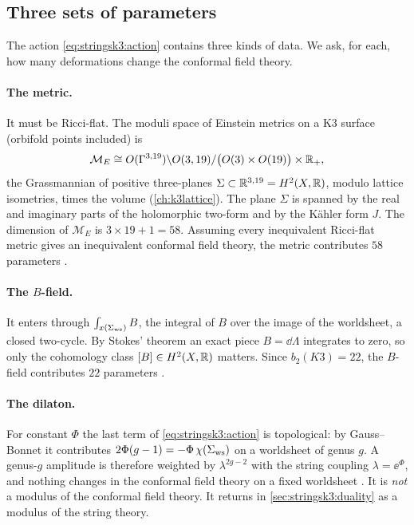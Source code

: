 \subsection{Three sets of parameters}
The action \eqref{eq:stringsk3:action} contains three kinds of data. We ask, for each, how
many deformations change the conformal field theory.

\paragraph{The metric.} It must be Ricci-flat. The moduli space of Einstein metrics on a K3
surface (orbifold points included) is
\begin{equation}\label{eq:stringsk3:einstein}
  \mathcal M_E\cong O(\Gamma^{3,19})\backslash O(3,19)/\big(O(3)\times O(19)\big)\times\mathbb{R}_+ ,
\end{equation}
the Grassmannian of positive three-planes $\Sigma\subset\mathbb{R}^{3,19}=H^2(X,\mathbb{R})$, modulo lattice
isometries, times the volume 
(\cref{ch:k3lattice}). The plane $\Sigma$ is spanned by the real and imaginary parts of the
holomorphic two-form and by the K\"ahler form $J$. The dimension of $\mathcal M_E$ is
$3\times19+1=58$.
Assuming every inequivalent Ricci-flat metric gives an inequivalent conformal field theory,
the metric contributes $58$ parameters .

\paragraph{The $B$-field.} It enters through $\int_{x(\Sigma_{\rm ws})}B$, the integral of $B$
over the image of the worldsheet, a closed two-cycle. By Stokes' theorem an exact piece
$B=\dd\Lambda$ integrates to zero, so only the cohomology class $[B]\in H^2(X,\mathbb{R})$ matters.
Since $b_2(K3)=22$, the $B$-field contributes $22$ parameters
.

\paragraph{The dilaton.} For constant $\Phi$ the last term of \eqref{eq:stringsk3:action} is
topological: by Gauss--Bonnet it contributes $2\Phi(g-1)=-\Phi\,\chi(\Sigma_{\rm ws})$ on a
worldsheet of genus $g$. A genus-$g$ amplitude is therefore weighted by $\lambda^{2g-2}$ with
the string coupling $\lambda=\ee^{\Phi}$, and nothing changes in the conformal field theory on
a fixed worldsheet . It is
\emph{not} a modulus of the conformal field theory. It returns in
\cref{sec:stringsk3:duality} as a modulus of the string theory.

